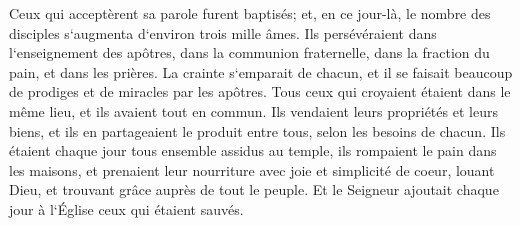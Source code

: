 \verse Ceux qui acceptèrent sa parole furent baptisés; et, en ce jour-là, le nombre des disciples s`augmenta d`environ trois mille âmes. 
\verse Ils persévéraient dans l`enseignement des apôtres, dans la communion fraternelle, dans la fraction du pain, et dans les prières. 
\verse La crainte s`emparait de chacun, et il se faisait beaucoup de prodiges et de miracles par les apôtres. 
\verse Tous ceux qui croyaient étaient dans le même lieu, et ils avaient tout en commun. 
\verse Ils vendaient leurs propriétés et leurs biens, et ils en partageaient le produit entre tous, selon les besoins de chacun. 
\verse Ils étaient chaque jour tous ensemble assidus au temple, ils rompaient le pain dans les maisons, et prenaient leur nourriture avec joie et simplicité de coeur, 
\verse louant Dieu, et trouvant grâce auprès de tout le peuple. Et le Seigneur ajoutait chaque jour à l`Église ceux qui étaient sauvés. 

